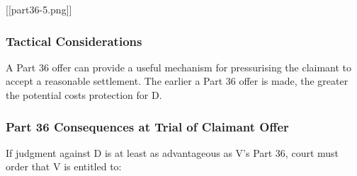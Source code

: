 \documentclass[
]{article}
\begin{document}
{[}{[}part36-5.png{]}{]}

\hypertarget{tactical-considerations}{%
\subsubsection{Tactical Considerations}\label{tactical-considerations}}

A Part 36 offer can provide a useful mechanism for pressurising the
claimant to accept a reasonable settlement. The earlier a Part 36 offer
is made, the greater the potential costs protection for D.

\hypertarget{part-36-consequences-at-trial-of-claimant-offer}{%
\subsubsection{Part 36 Consequences at Trial of Claimant
Offer}\label{part-36-consequences-at-trial-of-claimant-offer}}

If judgment against D is at least as advantageous as V's Part 36, court
must order that V is entitled to:
\end{document}

